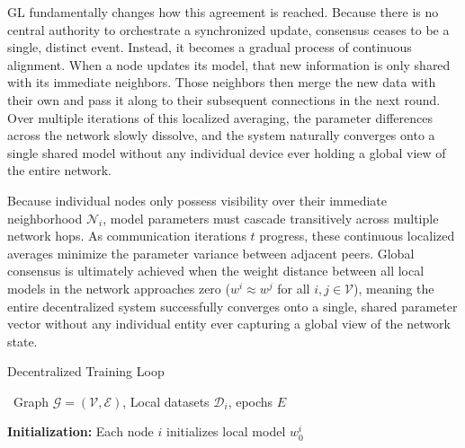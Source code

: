 GL fundamentally changes how this agreement is reached. Because there is no central authority to orchestrate a synchronized update, consensus ceases to be a single, distinct event. Instead, it becomes a gradual process of continuous alignment. When a node updates its model, that new information is only shared with its immediate neighbors. Those neighbors then merge the new data with their own and pass it along to their subsequent connections in the next round. Over multiple iterations of this localized averaging, the parameter differences across the network slowly dissolve, and the system naturally converges onto a single shared model without any individual device ever holding a global view of the entire network.

Because individual nodes only possess visibility over their immediate neighborhood $\mathcal{N}_i$, model parameters must cascade transitively across multiple network hops. As communication iterations $t$ progress, these continuous localized averages minimize the parameter variance between adjacent peers. Global consensus is ultimately achieved when the weight distance between all local models in the network approaches zero ($w^{i} \approx w^{j}$ for all $i, j \in \mathcal{V}$), meaning the entire decentralized system successfully converges onto a single, shared parameter vector without any individual entity ever capturing a global view of the network state.

\begin{ifalgorithm}[t]
\caption{Standard DFL Loop}
\label{alg:gossip_learning}
\begin{ifpseudo}{Decentralized Training Loop}
    \item \In\ Graph $\mathcal{G} = (\mathcal{V}, \mathcal{E})$, Local datasets $\mathcal{D}_i$, epochs $E$
    \item \textbf{Initialization:} Each node $i$ initializes local model $w_0^i$
    \item {}
    \item {}
    \item {}
    \item {}
    \item {}
    \item {}
    \item {}
    \item {}
    \item {}
    \item \T{\Done}
    \item \EFor
\end{ifpseudo}
\end{ifalgorithm}

